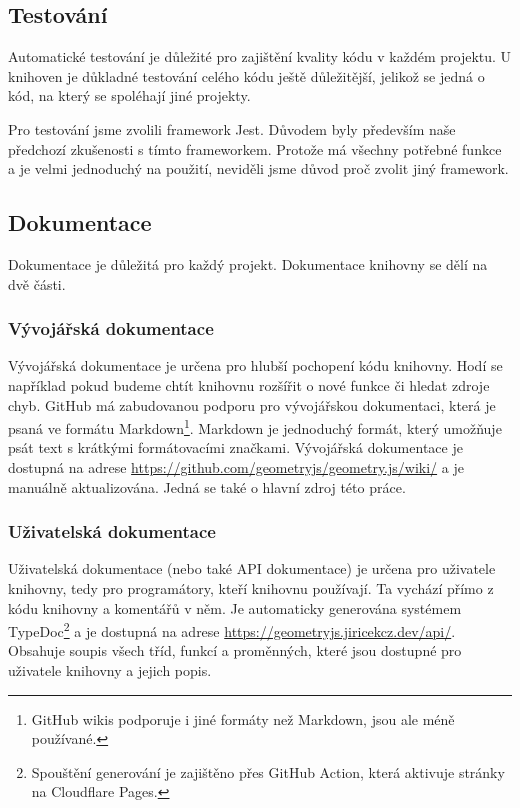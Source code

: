 \subsection{Testování}
\label{subsec:testing}

Automatické testování je důležité pro zajištění kvality kódu v každém projektu. 
U knihoven je důkladné testování celého kódu ještě důležitější, jelikož se jedná o kód, na který se spoléhají jiné projekty.

Pro testování jsme zvolili framework Jest\cite{geometryjs:wiki:technologies}.
Důvodem byly především naše předchozí zkušenosti s tímto frameworkem.
Protože má všechny potřebné funkce a je velmi jednoduchý na použití, neviděli jsme důvod proč zvolit jiný framework.

\subsection{Dokumentace}
\label{subsec:documentation}

Dokumentace je důležitá pro každý projekt.
Dokumentace knihovny se dělí na dvě části.

\subsubsection{Vývojářská dokumentace}
\label{subsubsec:developer-documentation}

Vývojářská dokumentace je určena pro hlubší pochopení kódu knihovny.
Hodí se například pokud budeme chtít knihovnu rozšířit o nové funkce či hledat zdroje chyb.
GitHub má zabudovanou podporu pro vývojářskou dokumentaci\cite{GitHub:wikis}, která je psaná ve formátu Markdown\footnote{GitHub wikis podporuje i jiné formáty než Markdown, jsou ale méně používané.}.
Markdown je jednoduchý formát, který umožňuje psát text s krátkými formátovacími značkami\cite{GitHub:markdown}.
Vývojářská dokumentace je dostupná na adrese \url{https://github.com/geometryjs/geometry.js/wiki/} a je manuálně aktualizována. 
Jedná se také o hlavní zdroj této práce.

\subsubsection{Uživatelská dokumentace}
\label{subsubsec:user-documentation}

Uživatelská dokumentace (nebo také API dokumentace) je určena pro uživatele knihovny, tedy pro programátory, kteří knihovnu používají.
Ta vychází přímo z kódu knihovny a komentářů v něm.
Je automaticky generována systémem TypeDoc\footnote{Spouštění generování je zajištěno přes GitHub Action, která aktivuje  stránky na Cloudflare Pages\cite{geometryjs:wiki:api}.}\cite{geometryjs:wiki:technologies} a je dostupná na adrese \url{https://geometryjs.jiricekcz.dev/api/}.
Obsahuje soupis všech tříd, funkcí a proměnných, které jsou dostupné pro uživatele knihovny a jejich popis.